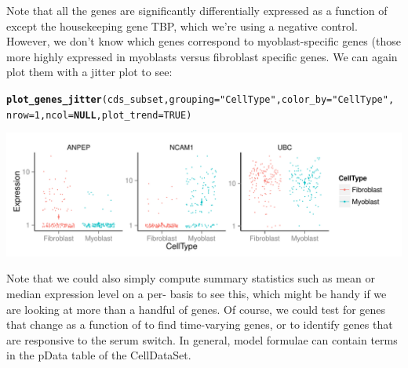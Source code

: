 \documentclass[10pt,oneside]{article}\usepackage[]{graphicx}\usepackage[]{color}
\makeatletter
\def\maxwidth{ %
  \ifdim\Gin@nat@width>\linewidth
    \linewidth
  \else
    \Gin@nat@width
  \fi
}
\newcommand{\hlnum}[1]{\textcolor[rgb]{0.686,0.059,0.569}{#1}}%
\newcommand{\hlstr}[1]{\textcolor[rgb]{0.192,0.494,0.8}{#1}}%
\newcommand{\hlstd}[1]{\textcolor[rgb]{0.345,0.345,0.345}{#1}}%
\newcommand{\hlkwa}[1]{\textcolor[rgb]{0.161,0.373,0.58}{\textbf{#1}}}%
\newcommand{\hlkwc}[1]{\textcolor[rgb]{0.333,0.667,0.333}{#1}}%
\newcommand{\hlkwd}[1]{\textcolor[rgb]{0.737,0.353,0.396}{\textbf{#1}}}%
\newenvironment{kframe}{%
 \def\at@end@of@kframe{}%
 \ifinner\ifhmode%
  \def\at@end@of@kframe{\end{minipage}}%
  \begin{minipage}{\columnwidth}%
 \fi\fi%
 \def\FrameCommand##1{\hskip\@totalleftmargin \hskip-\fboxsep
 \colorbox{shadecolor}{##1}\hskip-\fboxsep
     \hskip-\linewidth \hskip-\@totalleftmargin \hskip\columnwidth}%
 \MakeFramed {\advance\hsize-\width
   \@totalleftmargin\z@ \linewidth\hsize
   \@setminipage}}%
 {\par\unskip\endMakeFramed%
 \at@end@of@kframe}
\newenvironment{knitrout}{}{} %
\makeatother
\begin{document}
Note that all the genes are significantly differentially expressed as a function of  except the housekeeping gene TBP, which we're using a negative control.  However, we don't know which genes correspond to myoblast-specific genes (those more highly expressed in myoblasts versus fibroblast specific genes.  We can again plot them with a jitter plot to see:

\begin{knitrout}
\color{fgcolor}\begin{kframe}
\begin{alltt}
\hlkwd{plot_genes_jitter}\hlstd{(cds_subset,} \hlkwc{grouping}\hlstd{=}\hlstr{"CellType"}\hlstd{,} \hlkwc{color_by}\hlstd{=}\hlstr{"CellType"}\hlstd{,}
                  \hlkwc{nrow}\hlstd{=}\hlnum{1}\hlstd{,} \hlkwc{ncol}\hlstd{=}\hlkwa{NULL}\hlstd{,} \hlkwc{plot_trend}\hlstd{=}\hlnum{TRUE}\hlstd{)}
\end{alltt}


{\ttfamily\noindent\itshape\color{messagecolor}{\#\# geom\_path: Each group consists of only one observation. Do you need to\\\#\# adjust the group aesthetic?\\\#\# geom\_path: Each group consists of only one observation. Do you need to\\\#\# adjust the group aesthetic?\\\#\# geom\_path: Each group consists of only one observation. Do you need to\\\#\# adjust the group aesthetic?}}\end{kframe}

{\centering \includegraphics[width=\maxwidth]{figure/jitter_plot_diff_res-1} 

}



\end{knitrout}

Note that we could also simply compute summary statistics such as mean or median expression level on a per- basis to see this, which might be handy if we are looking at more than a handful of genes. Of course, we could test for genes that change as a function of  to find time-varying genes, or  to identify genes that are responsive to the serum switch.  In general, model formulae can contain terms in the pData table of the CellDataSet. 
\end{document}
